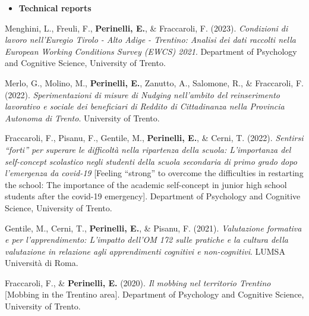 \documentclass[hidelinks, letterpaper,10pt]{article} %
\begin{document}
\begin{itemize}
	\setlength{\topsep}{0pt}%
	\setlength{\leftmargin}{0.1in}%
	\setlength{\listparindent}{-0.1in}%
	\setlength{\itemindent}{-0.2in}%
	\setlength{\parsep}{\parskip}%
	
	\item {\textbf{\large{Technical reports}}}
\end{itemize}
\begin{etaremune}

\item Menghini, L., Freuli, F., \textbf{Perinelli, E.}, \& Fraccaroli, F. (2023). \textit{Condizioni di lavoro nell’Euregio Tirolo - Alto Adige - Trentino: Analisi dei dati raccolti nella European Working Conditions Survey (EWCS) 2021}. Department of Psychology and Cognitive Science, University of Trento.

\item Merlo, G., Molino, M., \textbf{Perinelli, E.}, Zanutto, A., Salomone, R., \& Fraccaroli, F. (2022). \textit{Sperimentazioni di misure di Nudging nell’ambito del reinserimento lavorativo e sociale dei beneficiari di Reddito di Cittadinanza nella Provincia Autonoma di Trento}. University of Trento.
    
\item Fraccaroli, F., Pisanu, F., Gentile, M., \textbf{Perinelli, E.}, \& Cerni, T. (2022). \textit{Sentirsi ``forti'' per superare le difficoltà nella ripartenza della scuola: L’importanza del self-concept scolastico negli studenti della scuola secondaria di primo grado dopo l’emergenza da covid-19} [Feeling ``strong'' to overcome the difficulties in restarting the school: The importance of the academic self-concept in junior high school students after the covid-19 emergency]. Department of Psychology and Cognitive Science, University of Trento.
	
\item Gentile, M., Cerni, T., \textbf{Perinelli, E.}, \& Pisanu, F. (2021). \textit{Valutazione formativa e per l’apprendimento: L’impatto dell’OM 172 sulle pratiche e la cultura della valutazione in relazione agli apprendimenti cognitivi e non-cognitivi}. LUMSA Università di Roma.
	
\item Fraccaroli, F., \& \textbf{Perinelli, E.} (2020). \textit{Il mobbing nel territorio Trentino} [Mobbing in the Trentino area]. Department of Psychology and Cognitive Science, University of Trento. 

\end{etaremune}
\vspace{3mm}
\end{document}
